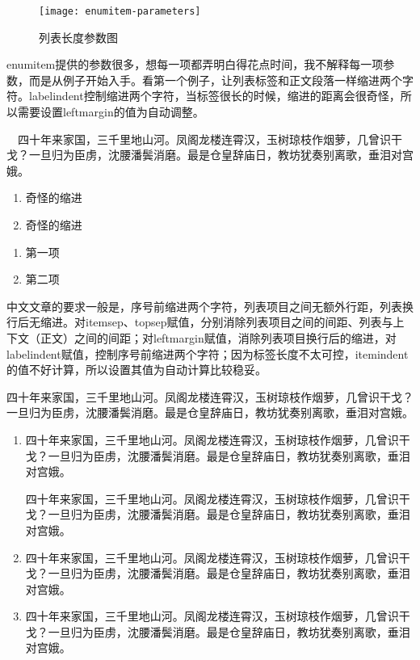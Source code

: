 \begin{figure}[!htb]
    \centering
    \texttt{[image: enumitem-parameters]}
    \caption{列表长度参数图}
\end{figure}

enumitem提供的参数很多，想每一项都弄明白得花点时间，我不解释每一项参数，而是从例子开始入手。看第一个例子，让列表标签和正文段落一样缩进两个字符。labelindent控制缩进两个字符，当标签很长的时候，缩进的距离会很奇怪，所以需要设置leftmargin的值为自动调整。

\begin{codeshowabove}
~~四十年来家国，三千里地山河。凤阁龙楼连霄汉，玉树琼枝作烟萝，几曾识干戈？一旦归为臣虏，沈腰潘鬓消磨。最是仓皇辞庙日，教坊犹奏别离歌，垂泪对宫娥。
\begin{enumerate}[label=(\arabic*).,labelindent=\parindent]
    \item 奇怪的缩进
    \item 奇怪的缩进
\end{enumerate}
\begin{enumerate}[label=(\arabic*),labelindent=\parindent,leftmargin=*]
    \item 第一项
    \item 第二项
\end{enumerate}
\end{codeshowabove}

中文文章的要求一般是，序号前缩进两个字符，列表项目之间无额外行距，列表换行后无缩进。对itemsep、topsep赋值，分别消除列表项目之间的间距、列表与上下文（正文）之间的间距；对leftmargin赋值，消除列表项目换行后的缩进，对labelindent赋值，控制序号前缩进两个字符；因为标签长度不太可控，itemindent的值不好计算，所以设置其值为自动计算比较稳妥。

四十年来家国，三千里地山河。凤阁龙楼连霄汉，玉树琼枝作烟萝，几曾识干戈？一旦归为臣虏，沈腰潘鬓消磨。最是仓皇辞庙日，教坊犹奏别离歌，垂泪对宫娥。
\begin{enumerate}[label=(\arabic*),itemsep=0pt,parsep=0pt,topsep=0pt,leftmargin=0pt,labelindent=\parindent,itemindent=*]
\item 四十年来家国，三千里地山河。凤阁龙楼连霄汉，玉树琼枝作烟萝，几曾识干戈？一旦归为臣虏，沈腰潘鬓消磨。最是仓皇辞庙日，教坊犹奏别离歌，垂泪对宫娥。

四十年来家国，三千里地山河。凤阁龙楼连霄汉，玉树琼枝作烟萝，几曾识干戈？一旦归为臣虏，沈腰潘鬓消磨。最是仓皇辞庙日，教坊犹奏别离歌，垂泪对宫娥。

\item 四十年来家国，三千里地山河。凤阁龙楼连霄汉，玉树琼枝作烟萝，几曾识干戈？一旦归为臣虏，沈腰潘鬓消磨。最是仓皇辞庙日，教坊犹奏别离歌，垂泪对宫娥。
\item 四十年来家国，三千里地山河。凤阁龙楼连霄汉，玉树琼枝作烟萝，几曾识干戈？一旦归为臣虏，沈腰潘鬓消磨。最是仓皇辞庙日，教坊犹奏别离歌，垂泪对宫娥。
\end{enumerate}

